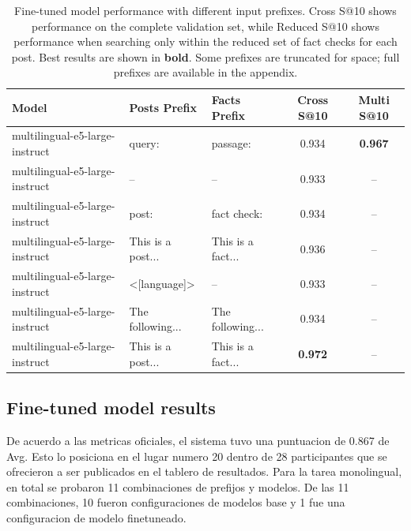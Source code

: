 \documentclass[11pt]{article}
\begin{document}
\begin{table}[t]
  \centering
  \small
  \begin{tabular}{p{4.5cm}p{2cm}p{2cm}cc}
    \hline
    \textbf{Model} & \textbf{Posts Prefix} & \textbf{Facts Prefix} & \textbf{Cross S@10} & \textbf{Multi S@10} \\
    \hline
    multilingual-e5-large-instruct & query: & passage: & 0.934 & \textbf{0.967} \\
    multilingual-e5-large-instruct & -- & -- & 0.933 & -- \\
    multilingual-e5-large-instruct & post: & fact check: & 0.934 & -- \\
    multilingual-e5-large-instruct & This is a post... & This is a fact... & 0.936 & -- \\
    multilingual-e5-large-instruct & <[language]> & -- & 0.933 & -- \\
    multilingual-e5-large-instruct & The following... & The following... & 0.934 & -- \\
    multilingual-e5-large-instruct & This is a post... & This is a fact... & \textbf{0.972} & -- \\
    \hline
  \end{tabular}
  \caption{Fine-tuned model performance with different input prefixes. Cross S@10 shows performance on the complete validation set, while Reduced S@10 shows performance when searching only within the reduced set of fact checks for each post. Best results are shown in \textbf{bold}. Some prefixes are truncated for space; full prefixes are available in the appendix.}
  \label{tab:model-results-finetuned}
\end{table}

\subsection{Fine-tuned model results}


De acuerdo a las metricas oficiales, el sistema tuvo una puntuacion de 0.867 de Avg. Esto lo posiciona en el lugar numero 20 dentro de 28 participantes que se ofrecieron a ser publicados en el tablero de resultados.
Para la tarea monolingual, en total se probaron 11 combinaciones de prefijos y modelos. De las 11 combinaciones, 10 fueron configuraciones de modelos base y 1 fue una configuracion de modelo finetuneado.
\end{document}
